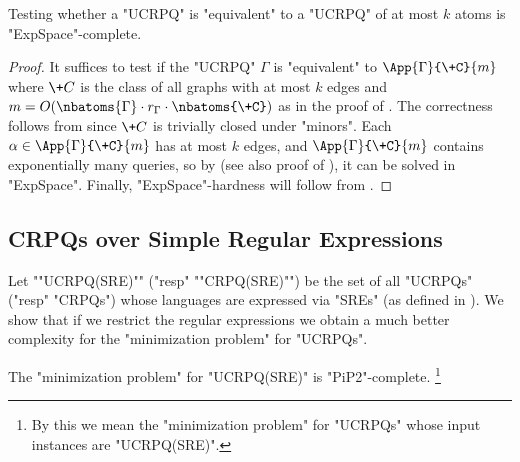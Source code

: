 \begin{corollary}
	\AP\label{coro:upperbound-ucrpqs}
	Testing whether a "UCRPQ" is "equivalent" to a "UCRPQ" of at most $k$ atoms is "ExpSpace"-complete.
\end{corollary}

\begin{proof}
	It suffices to test if the "UCRPQ" $\Gamma$ is "equivalent"
	to $\App{\Gamma}{\+C}{m}$ where $\+C$ is the class of all graphs
	with at most $k$ edges and $m=O(\nbatoms{\Gamma}\cdot r_{\Gamma} \cdot \nbatoms{\+C})$ as in the proof of . 
	The correctness follows from  since $\+C$ is
	trivially closed under "minors".
	Each $\alpha \in \App{\Gamma}{\+C}{m}$ has at most $k$ edges,
	and $\App{\Gamma}{\+C}{m}$ contains exponentially many queries,
	so by \cite[Proposition 3.11]{FigueiraMorvan2025SemanticTreeWidthLMCS} (see also proof of ), it can be solved
	in "ExpSpace".
	Finally, "ExpSpace"-hardness will follow from .
\end{proof}

\subsection{CRPQs over Simple Regular Expressions}

\AP Let ""UCRPQ(SRE)"" ("resp" ""CRPQ(SRE)"") be the set of all "UCRPQs" ("resp" "CRPQs") whose languages are expressed via "SREs" (as defined in ). We show that if we restrict the regular expressions we obtain a much better complexity for the "minimization problem" for "UCRPQs".

\begin{theorem}\AP\label{thm:minimization-SRE}
	The "minimization problem" for "UCRPQ(SRE)" is "PiP2"-complete.%
	\footnote{By this we mean the "minimization problem" for "UCRPQs" whose input instances are "UCRPQ(SRE)".}
\end{theorem}

